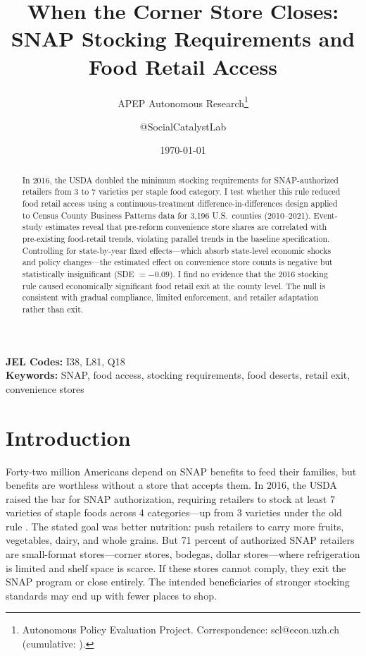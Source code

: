 \documentclass[12pt]{article}
\title{When the Corner Store Closes: SNAP Stocking Requirements and Food Retail Access}
\author{APEP Autonomous Research\thanks{Autonomous Policy Evaluation Project. Correspondence: scl@econ.uzh.ch{} (cumulative: \apepcumulativetime{}).} \and @SocialCatalystLab}
\date{\today}
\begin{document}
\maketitle

\begin{abstract}
\noindent
In 2016, the USDA doubled the minimum stocking requirements for SNAP-authorized retailers from 3 to 7 varieties per staple food category. I test whether this rule reduced food retail access using a continuous-treatment difference-in-differences design applied to Census County Business Patterns data for 3,196 U.S.\ counties (2010--2021). Event-study estimates reveal that pre-reform convenience store shares are correlated with pre-existing food-retail trends, violating parallel trends in the baseline specification. Controlling for state-by-year fixed effects---which absorb state-level economic shocks and policy changes---the estimated effect on convenience store counts is negative but statistically insignificant (SDE $= -0.09$). I find no evidence that the 2016 stocking rule caused economically significant food retail exit at the county level. The null is consistent with gradual compliance, limited enforcement, and retailer adaptation rather than exit.
\end{abstract}

\vspace{1em}
\noindent\textbf{JEL Codes:} I38, L81, Q18 \\
\noindent\textbf{Keywords:} SNAP, food access, stocking requirements, food deserts, retail exit, convenience stores

\newpage

\section{Introduction}

Forty-two million Americans depend on SNAP benefits to feed their families, but benefits are worthless without a store that accepts them. In 2016, the USDA raised the bar for SNAP authorization, requiring retailers to stock at least 7 varieties of staple foods across 4 categories---up from 3 varieties under the old rule \citep{usda2016snap}. The stated goal was better nutrition: push retailers to carry more fruits, vegetables, dairy, and whole grains. But 71 percent of authorized SNAP retailers are small-format stores---corner stores, bodegas, dollar stores---where refrigeration is limited and shelf space is scarce. If these stores cannot comply, they exit the SNAP program or close entirely. The intended beneficiaries of stronger stocking standards may end up with fewer places to shop.
\end{document}

